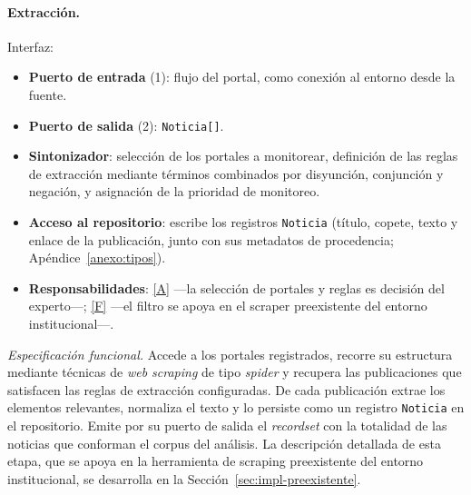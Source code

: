 \documentclass[12pt]{report}
\DeclareRobustCommand{\resp}[1]{\hyperref[tab:registro-responsabilidades]{\textcolor{respcolor}{[#1]}}}
\begin{document}
\paragraph{Extracción.} Interfaz:
\begin{itemize}
  \item \textbf{Puerto de entrada} (1): flujo del portal, como conexión al entorno desde la fuente.
  \item \textbf{Puerto de salida} (2): \texttt{Noticia[]}.
  \item \textbf{Sintonizador}: selección de los portales a monitorear, definición de las reglas de extracción mediante términos combinados por disyunción, conjunción y negación, y asignación de la prioridad de monitoreo.
  \item \textbf{Acceso al repositorio}: escribe los registros \texttt{Noticia} (título, copete, texto y enlace de la publicación, junto con sus metadatos de procedencia; Apéndice~\ref{anexo:tipos}).
  \item \textbf{Responsabilidades}: \resp{A} ---la selección de portales y reglas es decisión del experto---; \resp{F} ---el filtro se apoya en el scraper preexistente del entorno institucional---.
\end{itemize}
\textit{Especificación funcional.} Accede a los portales registrados, recorre su estructura mediante técnicas de \textit{web scraping} de tipo \textit{spider} y recupera las publicaciones que satisfacen las reglas de extracción configuradas. De cada publicación extrae los elementos relevantes, normaliza el texto y lo persiste como un registro \texttt{Noticia} en el repositorio. Emite por su puerto de salida el \textit{recordset} con la totalidad de las noticias que conforman el corpus del análisis. La descripción detallada de esta etapa, que se apoya en la herramienta de scraping preexistente del entorno institucional, se desarrolla en la Sección~\ref{sec:impl-preexistente}.
\end{document}
